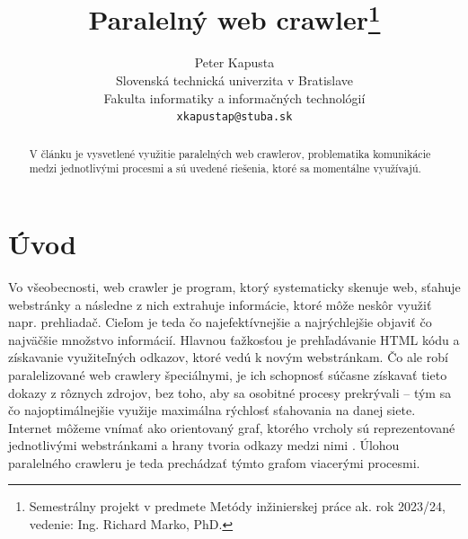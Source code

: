 \documentclass[10pt,twocolumn,twoside,slovak,a4paper]{article}
\title{Paralelný web crawler\thanks{Semestrálny projekt v predmete Metódy inžinierskej práce ak. rok 2023/24, vedenie: Ing. Richard Marko, PhD.}}
\author{Peter Kapusta \\
	\small Slovenská technická univerzita v Bratislave \\
	\small Fakulta informatiky a informačných technológií \\
	\small \texttt{xkapustap@stuba.sk}
}
\begin{document}
\maketitle

\begin{abstract}
V článku je vysvetlené využitie paralelných web crawlerov, problematika komunikácie medzi jednotlivými procesmi a sú uvedené riešenia, ktoré sa momentálne využívajú.
\end{abstract}

\section{Úvod}

Vo všeobecnosti, web crawler je program, ktorý systematicky skenuje web, sťahuje webstránky a následne z nich extrahuje informácie, ktoré môže neskôr využiť napr. prehliadač. Cieľom je teda čo najefektívnejšie a najrýchlejšie objaviť čo najväčšie množstvo informácií. Hlavnou ťažkosťou je prehľadávanie HTML kódu a získavanie využiteľných odkazov, ktoré vedú k novým webstránkam. Čo ale robí paralelizované web crawlery špeciálnymi, je ich schopnosť súčasne získavať tieto dokazy z rôznych zdrojov, bez toho, aby sa osobitné procesy prekrývali – tým sa čo najoptimálnejšie využije maximálna rýchlosť sťahovania na danej siete. Internet môžeme vnímať ako orientovaný graf, ktorého vrcholy sú reprezentované jednotlivými webstránkami a hrany tvoria odkazy medzi nimi \cite{7148493}. Úlohou paralelného crawleru je teda prechádzať týmto grafom viacerými procesmi.

\newpage
\end{document}
